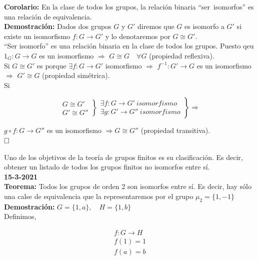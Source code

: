 \documentclass{article}
\begin{document}
\textbf{Corolario:} En la clase de todos los grupos, la relación binaria ``ser~isomorfos'' es una relación de equivalencia. \\

\textbf{Demostración:} Dados dos grupos $G$ y $G'$ diremos que $G$ es isomorfo a $G'$ si existe un isomorfismo $f:G\rightarrow G'$ y lo denotaremos por $G\cong G'$. \\

``Ser isomorfo'' es una relación binaria en la clase de todos los grupos. Puesto qeu $1_G:G\rightarrow G$ es un isomorfismo $\Rightarrow$ $G\cong G \quad \forall G$ (propiedad reflexiva). \\

Si $G\cong G'$ es porque $\exists f:G\rightarrow G'$ isomorfismo $\Rightarrow$ $f^{-1}:G'\rightarrow G$ es un isomorfismo $\Rightarrow$ $G'\cong G$ (propiedad simétrica). \\

Si

\[
\left.\begin{array}{c}
G \cong G' \\
G'\cong G''
\end{array} \right\rbrace
\left. \begin{array}{c}
\exists f:G\rightarrow G'~isomorfismo \\
\exists g:G'\rightarrow G''~isomorfismo
\end{array} \right\rbrace
\Rightarrow
\]

$g\circ f:G\rightarrow G''$ es un isomorfismo $\Rightarrow G\cong G''$ (propiedad transitiva). \\

$\hfill\square$

Uno de los objetivos de la teoría de grupos finitos es su clasificación. Es decir, obtener un listado de todos los grupos finitos no isomorfos entre sí. \\

\textbf{15-3-2021} \\

\textbf{Teorema:} Todos los grupos de orden 2 son isomorfos entre sí. Es decir, hay sólo una calse de equivalencia que la representaremos por el grupo $\mu_2=\{1,-1\}$ \\

\textbf{Demostración:} $G=\{1,a\}, \quad H=\{1,b\}$ \\

Definimos,

\begin{gather*}
f:G\rightarrow H \\
f(1)=1 \\
f(a)=b
\end{gather*}
\end{document}
